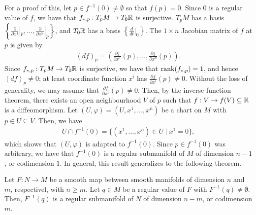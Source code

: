 For a proof of this, let $p \in f^{-1}(0) \neq \emptyset$ so that $f(p) = 0$. Since $0$ is a regular value of $f$, we have that $f_{\ast,p}:T_{p}M \to T_{0}\mathbb{R}$ is surjective. $T_{p}M$ has a basis $\left\{\frac{\partial}{\partial x^{1}}|_{p},\ldots,\frac{\partial}{\partial x^{n}}|_{p}\right\}$, and $T_{0}\mathbb{R}$ has a basis $\left\{\frac{d}{dt}|_{0}\right\}$. The $1 \times n$ Jacobian matrix of $f$ at $p$ is given by
\begin{align}
    (d f)_{p} = \left( \frac{\partial f}{\partial x^{1}}(p),\ldots,\frac{\partial f}{\partial x^{n}}(p) \right).
\end{align}
Since $f_{\ast,p}:T_{p}M \to T_{0}\mathbb{R}$ is surjective, we have that $\operatorname{rank}(f_{\ast,p}) = 1$, and hence $(d f)_{p} \neq 0$; at least coordinate function $x^{i}$ has $\frac{\partial f}{\partial x^{i}}(p) \neq 0$. Without the loss of generality, we may assume that $\frac{\partial f}{\partial x^{1}}(p) \neq 0$. Then, by the inverse function theorem, there exists an open neighbourhood $V$ of $p$ such that $f:V \to f(V) \subseteq \mathbb{R}$ is a diffeomorphism. Let $(U,\varphi) = (U,x^{1},\ldots,x^{n})$ be a chart on $M$ with $p \in U \subseteq V$. Then, we have
\begin{align}
    U \cap f^{-1}(0) = \{(x^{1},\ldots,x^{n}) \in U \mid x^{1} = 0\},
\end{align}
which shows that $(U,\varphi)$ is adapted to $f^{-1}(0)$. Since $p \in f^{-1}(0)$ was arbitrary, we have that $f^{-1}(0)$ is a regular submanifold of $M$ of dimension $n-1$, or codimension $1$. In general, this result generalizes to the following theorem.

\begin{theorem}
    Let $F:N \to M$ be a smooth map between smooth manifolds of dimension $n$ and $m$, respectivel, with $n \geq m$. Let $q \in M$ be a regular value of $F$ with $F^{-1}(q) \neq \emptyset$. Then, $F^{-1}(q)$ is a regular submanifold of $N$ of dimension $n-m$, or codimension $m$.
\end{theorem}

